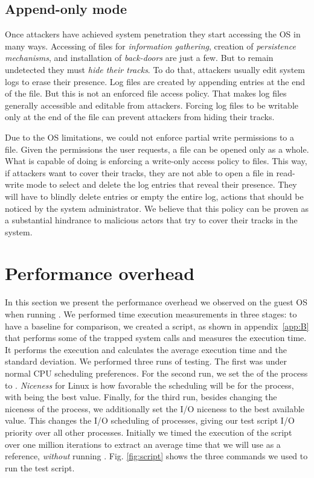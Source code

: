 \subsection{Append-only mode}

\par Once attackers have achieved system penetration they start accessing the \ac{OS} in many ways. Accessing of files for \emph{information gathering}, creation of \emph{persistence mechanisms}, and installation of \emph{back-doors} are just a few. But to remain undetected they must \emph{hide their tracks}. To do that, attackers usually edit system logs to erase their presence. Log files are created by appending entries at the end of the file. But this is not an enforced file access policy. That makes log files generally accessible and editable from attackers. Forcing log files to be writable only at the end of the file can prevent attackers from hiding their tracks.

\par Due to the \ac{OS} limitations, we could not enforce partial write permissions to a file. Given the permissions the user requests, a file can be opened only as a whole. What  is capable of doing is enforcing a write-only access policy to files. This way, if attackers want to cover their tracks, they are not able to open a file in read-write mode to select and delete the log entries that reveal their presence. They will have to blindly delete entries or empty the entire log, actions that should be noticed by the system administrator. We believe that this policy can be proven as a substantial hindrance to malicious actors that try to cover their tracks in the system.

\section{Performance overhead}\label{sec:performance}

In this section we present the performance overhead we observed on the guest \ac{OS} when running . We performed time execution measurements in three stages: to have a baseline for comparison, we created a  script, as shown in appendix~\ref{app:B} that performs some of the trapped system calls and measures the execution time. It performs the execution and calculates the average execution time and the standard deviation. We performed three runs of testing. The first was under normal \ac{CPU} scheduling preferences. For the second run, we set the  of the process to . \emph{Niceness} for Linux is how favorable the scheduling will be for the process, with  being the best value. Finally, for the third run, besides changing the niceness of the process, we additionally set the I/O niceness to the best available value. This changes the I/O scheduling of processes, giving our test script I/O priority over all other processes. Initially we timed the execution of the script over one million iterations to extract an average time that we will use as a reference, \emph{without} running . Fig. \ref{fig:script} shows the three commands we used to run the test script.

